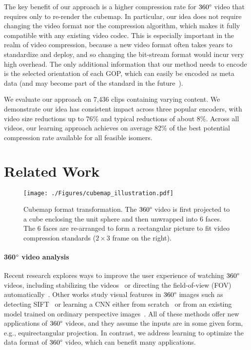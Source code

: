 \documentclass[journal,transmag]{IEEEtran}
\begin{document}
The key benefit of our approach is a higher compression rate for $360\degree$ video that requires only to re-render the cubemap.  In particular, our idea does not require changing the video format nor the compression algorithm,
which makes it fully compatible with any existing video codec.
This is especially important in the realm of video compression,
because a new video format often takes years to standardize and deploy,
and so changing the bit-stream format would incur very high overhead.
The only additional information that our method needs to encode is the selected orientation of each GOP,
which can easily be encoded as meta data (and may become part of the standard in the future~\cite{omaf2017wd}).


We evaluate our approach on 7,436 clips containing varying content.
We demonstrate our idea has consistent impact across three popular encoders,
with video size reductions up to 76\% and typical reductions of about 8\%.
Across all videos, our learning approach achieves on average 82\% of the best potential compression rate available for all feasible isomers.



\section{Related Work}

\begin{figure*}[t]
    \center
    \texttt{[image: ./Figures/cubemap\_illustration.pdf]}
    \caption{
        Cubemap format transformation.
        The $360\degree$ video is first projected to a cube enclosing the unit sphere and then unwrapped into 6 faces.
        The 6 faces are re-arranged to form a rectangular picture to fit video compression standards ($2{\times}3$ frame on the right).
    }
    \label{fig:faces}
\end{figure*}\paragraph{360$\degree$ video analysis}\label{par:_360degree_video}
Recent research explores ways to improve the user experience of watching $360\degree$ videos,
including stabilizing the videos~\cite{kasahara2015first,kopf2016tog,kamali2011stabilizing} or directing the field-of-view (FOV) automatically~\cite{su2016accv,su2017cvpr,hu2017deep,lai2017semantic}.
Other works study visual features in $360\degree$ images such as detecting SIFT~\cite{hansen2007scale} or learning a CNN either from scratch~\cite{khasanova2017graph,cohen2017convolutional} or from an existing model trained on ordinary perspective images~\cite{su2017nips}.
All of these methods offer new applications of $360\degree$ videos, and they assume the inputs are in some given form, e.g., equirectangular projection.
In contrast, we address learning to optimize the data format of $360\degree$ video, which can benefit many applications.
\end{document}

